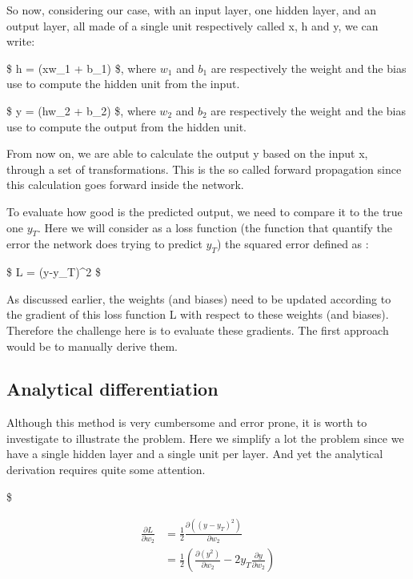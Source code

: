 \documentclass[11pt]{article}
\begin{document}
So now, considering our case, with an input layer, one hidden layer, and
an output layer, all made of a single unit respectively called x, h and
y, we can write:

\$ h = \sigma (xw\_1 + b\_1) \$, where \(w_1\) and \(b_1\) are
respectively the weight and the bias use to compute the hidden unit from
the input.

\$ y = \sigma (hw\_2 + b\_2) \$, where \(w_2\) and \(b_2\) are
respectively the weight and the bias use to compute the output from the
hidden unit.

From now on, we are able to calculate the output y based on the input x,
through a set of transformations. This is the so called forward
propagation since this calculation goes forward inside the network.

To evaluate how good is the predicted output, we need to compare it to
the true one \(y_T\). Here we will consider as a loss function (the
function that quantify the error the network does trying to predict
\(y_T\)) the squared error defined as :

\$ L =  (y-y\_T)\^{}2 \$

As discussed earlier, the weights (and biases) need to be updated
according to the gradient of this loss function L with respect to these
weights (and biases). Therefore the challenge here is to evaluate these
gradients. The first approach would be to manually derive them.

\subsection{Analytical
differentiation}\label{analytical-differentiation}

Although this method is very cumbersome and error prone, it is worth to
investigate to illustrate the problem. Here we simplify a lot the
problem since we have a single hidden layer and a single unit per layer.
And yet the analytical derivation requires quite some attention.

\$

\begin{equation} 
    \begin{split}
        \frac{\partial L}{\partial w_2} & = \frac{1}{2} \frac{\partial \left((y-y_T)^2\right)}{\partial w_2} \\
                                        & = \frac{1}{2} \left(\frac{\partial \left(y^2\right)}{\partial w_2} - 2y_T \frac{\partial y}{\partial w_2}\right)\\
    \end{split}
\end{equation}
\end{document}
